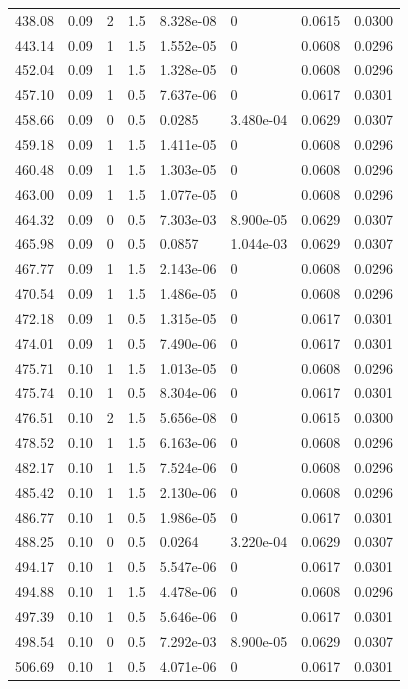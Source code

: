 \documentclass[preview]{standalone}
\begin{document}
{{{\begin{tabular}{L{1.2cm}C{1.2cm} C{0.3cm}C{0.5cm} C{1.4cm}C{1.4cm} C{1.4cm}C{1.4cm}}
  438.08  &  0.09  & 2     & 1.5 &  8.328e-08  & 0  & 0.0615 &  0.0300   \\ 
  443.14  &  0.09  & 1     & 1.5 &  1.552e-05  & 0  & 0.0608 &  0.0296   \\ 
  452.04  &  0.09  & 1     & 1.5 &  1.328e-05  & 0  & 0.0608 &  0.0296   \\ 
  457.10  &  0.09  & 1     & 0.5 &  7.637e-06  & 0  & 0.0617 &  0.0301   \\ 
  458.66  &  0.09  & 0     & 0.5 &  0.0285  & 3.480e-04  & 0.0629 &  0.0307   \\ 
  459.18  &  0.09  & 1     & 1.5 &  1.411e-05  & 0  & 0.0608 &  0.0296   \\ 
  460.48  &  0.09  & 1     & 1.5 &  1.303e-05  & 0  & 0.0608 &  0.0296   \\ 
  463.00  &  0.09  & 1     & 1.5 &  1.077e-05  & 0  & 0.0608 &  0.0296   \\ 
  464.32  &  0.09  & 0     & 0.5 &  7.303e-03  & 8.900e-05  & 0.0629 &  0.0307   \\ 
  465.98  &  0.09  & 0     & 0.5 &  0.0857  & 1.044e-03  & 0.0629 &  0.0307   \\ 
  467.77  &  0.09  & 1     & 1.5 &  2.143e-06  & 0  & 0.0608 &  0.0296   \\ 
  470.54  &  0.09  & 1     & 1.5 &  1.486e-05  & 0  & 0.0608 &  0.0296   \\ 
  472.18  &  0.09  & 1     & 0.5 &  1.315e-05  & 0  & 0.0617 &  0.0301   \\ 
  474.01  &  0.09  & 1     & 0.5 &  7.490e-06  & 0  & 0.0617 &  0.0301   \\ 
  475.71  &  0.10  & 1     & 1.5 &  1.013e-05  & 0  & 0.0608 &  0.0296   \\ 
  475.74  &  0.10  & 1     & 0.5 &  8.304e-06  & 0  & 0.0617 &  0.0301   \\ 
  476.51  &  0.10  & 2     & 1.5 &  5.656e-08  & 0  & 0.0615 &  0.0300   \\ 
  478.52  &  0.10  & 1     & 1.5 &  6.163e-06  & 0  & 0.0608 &  0.0296   \\ 
  482.17  &  0.10  & 1     & 1.5 &  7.524e-06  & 0  & 0.0608 &  0.0296   \\ 
  485.42  &  0.10  & 1     & 1.5 &  2.130e-06  & 0  & 0.0608 &  0.0296   \\ 
  486.77  &  0.10  & 1     & 0.5 &  1.986e-05  & 0  & 0.0617 &  0.0301   \\ 
  488.25  &  0.10  & 0     & 0.5 &  0.0264  & 3.220e-04  & 0.0629 &  0.0307   \\ 
  494.17  &  0.10  & 1     & 0.5 &  5.547e-06  & 0  & 0.0617 &  0.0301   \\ 
  494.88  &  0.10  & 1     & 1.5 &  4.478e-06  & 0  & 0.0608 &  0.0296   \\ 
  497.39  &  0.10  & 1     & 0.5 &  5.646e-06  & 0  & 0.0617 &  0.0301   \\ 
  498.54  &  0.10  & 0     & 0.5 &  7.292e-03  & 8.900e-05  & 0.0629 &  0.0307   \\ 
  506.69  &  0.10  & 1     & 0.5 &  4.071e-06  & 0  & 0.0617 &  0.0301   \\ 
\hline 
\end{tabular} 

}}}
\end{document}
